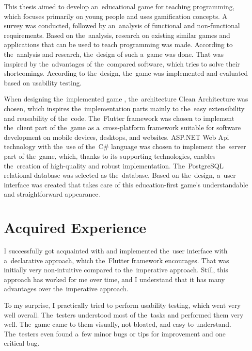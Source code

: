 \begin{conclusion}

This thesis aimed to develop an~educational game for teaching programming, which focuses primarily on young people and uses gamification concepts.
A survey was conducted, followed by an~analysis of functional and non-functional requirements.
Based on the~analysis, research on existing similar games and applications that can be used to teach programming was made.
According to the~analysis and research, the~design of such a~game was done.
That was inspired by the~advantages of the~compared software, which tries to solve their shortcomings.
According to the~design, the~game was implemented and evaluated based on usability testing.

When designing the~implemented game \myAppName{}, the~architecture Clean Architecture was chosen, which inspires the~implementation parts mainly to the~easy extensibility and reusability of the~code.
The~Flutter framework was chosen to implement the~client part of the~game as a~cross-platform framework suitable for software development on mobile devices, desktops, and websites.
ASP.NET Web Api technology with the~use of the~C\# language was chosen to implement the~server part of the~game, which, thanks to its supporting technologies, enables the~creation of high-quality and robust implementation.
The~PostgreSQL relational database was selected as the~database.
Based on the~design, a~user interface was created that takes care of this education-first game's understandable and straightforward appearance.

\section{Acquired Experience}

I successfully got acquainted with and implemented the~user interface with a~declarative approach, which the~Flutter framework encourages.
That was initially very non-intuitive compared to the~imperative approach.
Still, this approach has worked for me over time, and I understand that it has many advantages over the~imperative approach.

\pagebreak
To my surprise, I practically tried to perform usability testing, which went very well overall.
The~testers understood most of the~tasks and performed them very well.
The~game came to them visually, not bloated, and easy to understand.
The~testers even found a~few minor bugs or tips for improvement and one critical bug.


\end{conclusion}
